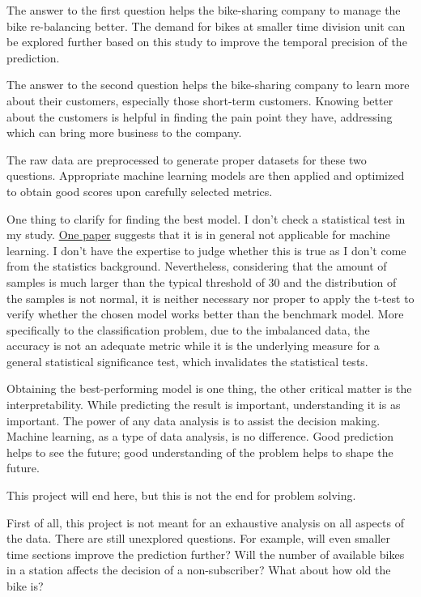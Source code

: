 \documentclass[a4paper]{article}
\begin{document}
	The answer to the first question helps the bike-sharing company to  manage the bike re-balancing better. The demand for bikes at smaller time division unit can be explored further based on this study to improve the temporal precision of the prediction.
	
	The answer to the second question helps the bike-sharing company to learn more about their customers, especially those short-term customers. Knowing better about the customers is helpful in finding the pain point they have, addressing which can bring more business to the company.
	
	The raw data are preprocessed to generate proper datasets for these two questions. Appropriate machine learning models are then applied and optimized to obtain good scores upon carefully selected metrics.
	
	One thing to clarify for finding the best model. I don't check a statistical test in my study.  \href{http://www.site.uottawa.ca/ICML08WS/papers/J_Demsar.pdf}{One paper} suggests that it is in general not applicable for machine learning. I don't have the expertise to judge whether this is true as I don't come from the statistics background. Nevertheless, considering that the amount of samples is much larger than the typical threshold of 30 and the distribution of the samples is not normal, it is neither necessary nor proper to apply the t-test to verify whether the chosen model works better than the benchmark model. More specifically to the classification problem, due to the imbalanced data, the accuracy is not an adequate metric while it is the underlying measure for a general statistical significance test, which invalidates the statistical tests. 
	
	Obtaining the best-performing model is one thing, the other critical matter is the interpretability. While predicting the result is important, understanding it is as important. The power of any data analysis is to assist the decision making. Machine learning, as a type of data analysis, is no difference. Good prediction helps to see the future; good understanding of the problem helps to shape the future.
		
	This project will end here, but this is not the end for problem solving. 
	
	First of all, this project is not meant for an exhaustive analysis on all aspects of the data. There are still unexplored questions. For example, will even smaller time sections improve the prediction further? Will the number of available bikes in a station affects the decision of a non-subscriber? What about how old the bike is? 
	
\end{document}
